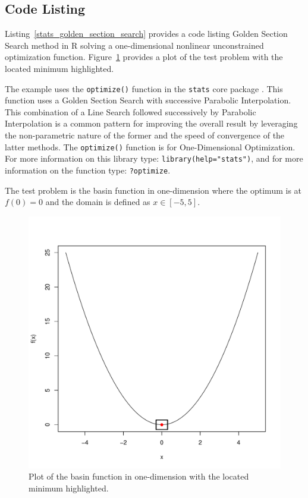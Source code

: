 \subsection{Code Listing}
Listing~\ref{stats_golden_section_search} provides a code listing Golden Section Search method in R solving a one-dimensional nonlinear unconstrained optimization function. Figure~\ref{plot:golden_section_search_result} provides a plot of the test problem with the located minimum highlighted.

The example uses the \texttt{optimize()} function in the \texttt{stats} core package \cite{RDCT2011a}. This function uses a Golden Section Search with successive Parabolic Interpolation. This combination of a Line Search followed successively by Parabolic Interpolation is a common pattern for improving the overall result by leveraging the non-parametric nature of the former and the speed of convergence of the latter methods. The \texttt{optimize()} function is for One-Dimensional Optimization. For more information on this library type: \texttt{library(help="stats")}, and for more information on the function type: \texttt{?optimize}.

The test problem is the basin function in one-dimension where the optimum is at $f(0)=0$ and the domain is defined as $x \in [-5,5]$. 



\begin{figure}[htp]
\centering
\includegraphics[scale=0.45]{a_optimization/golden_section_search_result.pdf}
\caption{Plot of the basin function in one-dimension with the located minimum highlighted.}
\label{plot:golden_section_search_result}
\end{figure}

